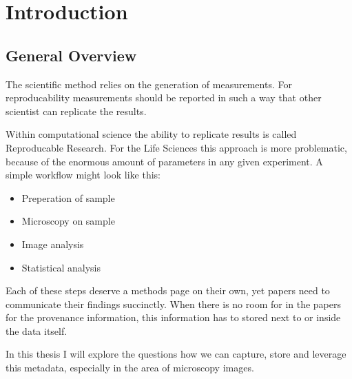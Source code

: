 
\chapter{Introduction} %

\label{Chapter1}



\section{General Overview}

The scientific method  relies on the
generation of measurements. For reproducability
 measurements should be reported in such a way
that other scientist can replicate the results.

Within computational science the ability to replicate results is
called Reproducable Research\cite{FomelReproducibleResearch}. For the Life
Sciences this approach is more problematic,
because of the enormous amount of parameters in any given
experiment. A simple workflow might look like this:

\begin{itemize}
\item Preperation of sample
\item Microscopy on sample
\item Image analysis
\item Statistical analysis
\end{itemize}

Each of these steps deserve a methods page on their own, yet papers
need to communicate their findings succinctly. When there is no room
for in the papers for the provenance information,
this information has to stored next to or inside the data itself.

In this thesis I will explore the questions how we can capture, store
and leverage this metadata, especially in the area of
microscopy images.


